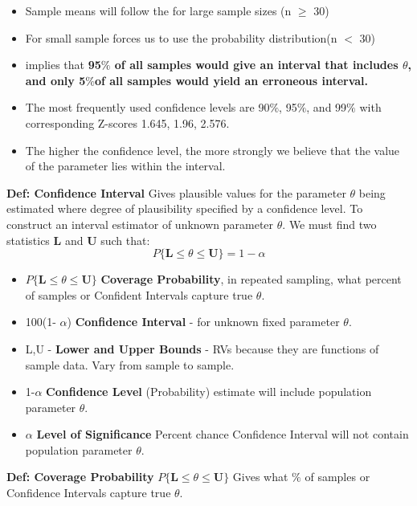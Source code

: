 \documentclass[]{article}
\begin{document}
\begin{itemize}
	\item Sample means will follow the  for large sample sizes (n $\ge$ 30)
	\item For small sample  forces us to use the  probability distribution(n $<$ 30)
	\item {} implies that \textbf{95$\%$ of all samples would give an interval that includes $\theta$, and only 5$\%$of all samples would yield an erroneous interval.}
	\item The most frequently used confidence levels are 90$\%$, 95$\%$, and 99$\%$ with corresponding Z-scores 1.645, 1.96, 2.576.
	\item The higher the confidence level, the more strongly we believe that the value of the parameter lies within the interval.
\end{itemize}
\Large\textbf{Def: Confidence Interval}
\newline Gives plausible values for the parameter $\theta$ being estimated where degree of plausibility specified by a confidence level.
\newline
\newline To construct an interval estimator of unknown parameter $\theta$. We must find two statistics \textbf{L} and \textbf{U} such that:
 \[  P \{\textbf{L} \le \theta \le \textbf{U}  \}  = 1 - \alpha  \] 
\begin{itemize}
	\item $P \{\textbf{L} \le \theta \le \textbf{U} \}$ \textbf{Coverage Probability}, in repeated sampling, what percent of samples or Confident Intervals capture true $\theta$.
	\item 100(1- $\alpha$) \textbf{Confidence Interval }- for unknown fixed parameter $\theta$.
	\item L,U - \textbf{Lower and Upper Bounds} - RVs because they are functions of sample data. Vary from sample to sample.
	\item 1-$\alpha$ \textbf{Confidence Level} (Probability) estimate will include population parameter $\theta$.
	\item $\alpha$ \textbf{Level of Significance} Percent chance Confidence Interval will not contain population parameter $\theta$.
\end{itemize}
\Large\textbf{Def: Coverage Probability}
\newline $P \{\textbf{L} \le \theta \le \textbf{U} \}$ Gives what $\%$ of samples or Confidence Intervals capture true $\theta$.
\end{document}
